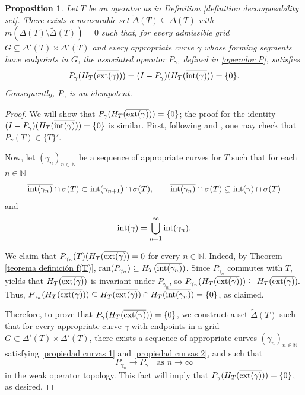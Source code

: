 \documentclass[11pt]{amsart}
\newtheorem{proposition}[theorem]{Proposition}
\theoremstyle{definition}
\theoremstyle{remark}
\numberwithin{equation}{section}
\newcommand{\ran}{\textnormal{ran}}
\newcommand{\N}{\mathbb{N}}
\newcommand{\Hext}{H_T(\overline{\exte(\gamma)})}
\newcommand {\conm}[1]{{\{#1\}'}}
\newcommand{\inte}{\textnormal{int}}
\newcommand{\exte}{\textnormal{ext}}
\begin{document}
	\begin{proposition}\label{proposition idempotent producto}
Let $T$ be an operator as in Definition \ref{definition decomposability set}. There exists a measurable set $\tilde{\Delta}(T)\subseteq \Delta(T)$ with $m(\Delta(T)\setminus \tilde{\Delta}(T))=0$ such that, for every admissible grid $G\subseteq \Delta'(T)\times \Delta'(T)$ and every appropriate curve $\gamma$ whose forming segments have endpoints in $G$, the associated operator $P_\gamma$, defined in \ref{operador P}, satisfies
$$
P_{\gamma}(H_T(\overline{\exte(\gamma)}))=(I-P_\gamma)(H_T(\overline{\inte(\gamma)}))=\{0\}.
$$
Consequently, $P_\gamma$ is an idempotent.	
\end{proposition}

\begin{proof}
	We will show that $P_\gamma(H_T(\overline{\exte(\gamma)}))=\{0\}$; the proof for the identity $(I-P_\gamma)(H_T(\overline{\inte(\gamma)}))=\{0\}$ is similar. First, following \cite[Lemma 2.14]{GG2} and \cite[Lemma 4.4]{GG3}, one may check that $P_{\gamma}(T) \in \conm{T}.$

\medskip

Now, let $(\gamma_n)_{n\in \N}$ be a sequence of appropriate curves for $T$ such that for each $n\in \N$
    \begin{equation}\label{propiedad curvas 1}
        \overline{\inte(\gamma_{n})}\cap\sigma(T) \subset \inte(\gamma_{n+1})\cap\sigma(T), \qquad \overline{\inte(\gamma_n)}\cap\sigma(T) \subsetneq \inte(\gamma)\cap\sigma(T)
    \end{equation}
    and
    \begin{equation}\label{propiedad curvas 2}
        \inte(\gamma)=\bigcup_{n=1}^\infty \inte(\gamma_n).
    \end{equation}
		
\medskip
		
We claim that $P_{\gamma_n}(T)(H_T( \overline{\exte(\gamma)}) = 0$ for every $n \in \N.$  Indeed, by  Theorem \ref{teorema definición f(T)}, $\ran(P_{\gamma_n})\subseteq H_T(\overline{\inte(\gamma_n)})$. Since $P_{\gamma_n}$ commutes with $T$, \cite[Proposition 1.2.16]{LN00} yields that $\Hext$ is invariant under $P_{\gamma_n}$, so $P_{\gamma_n}(\Hext)\subseteq \Hext.$ Thus, $P_{\gamma_n}(\Hext) \subseteq \Hext\cap H_T(\overline{\inte(\gamma_n)})=\{0\}$, as claimed.

\medskip

Therefore, to prove that $P_\gamma(\Hext)=\{0\}$, we construct a set $\tilde{\Delta}(T)$ such that for every appropriate curve $\gamma$ with endpoints in a grid $G \subset \Delta'(T)\times\Delta'(T)$, there exists a sequence of appropriate curves $(\gamma_n)_{n\in\mathbb{N}}$ satisfying \eqref{propiedad curvas 1} and \eqref{propiedad curvas 2}, and such that
$$
P_{\gamma_n} \to P_\gamma \quad \text{as } n\to\infty
$$
in the weak operator topology. This fact will imply that $P_\gamma(\Hext) = \{0\}$, as desired.


\end{proof}
\end{document}
